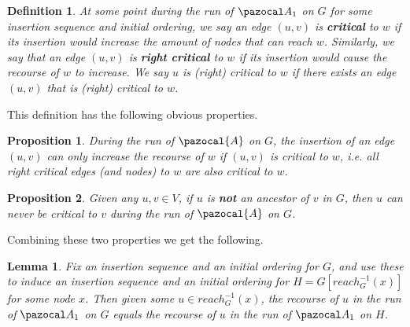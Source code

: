 \documentclass{report}
\newtheorem{lemma}{Lemma}
\newtheorem{proposition}{Proposition}
\newtheorem{definition}{Definition}
\begin{document}
\begin{definition}
At some point during the run of $\pazocal A_1$ on $G$ for some insertion sequence and initial ordering, we say an edge $(u,v)$ is \textbf{critical} to $w$ if its insertion would increase the amount of nodes that can reach $w$. Similarly, we say that an edge $(u,v)$ is \textbf{right critical} to $w$ if its insertion would cause the recourse of $w$ to increase. We say $u$ is (right) critical to $w$ if there exists an edge $(u,v)$ that is (right) critical to $w$.
\end{definition}

This definition has the following obvious properties.

\begin{proposition}
During the run of $\pazocal{A}$ on $G$, the insertion of an edge $(u,v)$ can only increase the recourse of $w$ if $(u,v)$ is critical to $w$, i.e. all right critical edges (and nodes) to $w$ are also critical to $w$.
\end{proposition}

\begin{proposition}
Given any $u,v \in V$, if $u$ is \textbf{not} an ancestor of $v$ in $G$, then $u$ can never be critical to $v$ during the run of $\pazocal{A}$ on $G$. 
\end{proposition}

Combining these two properties we get the following.

\begin{lemma}
Fix an insertion sequence and an initial ordering for $G$, and use these to induce an insertion sequence and an initial ordering for $H = G[reach^{-1}_{G}(x)]$ for some node $x$. Then given some $u \in reach^{-1}_{G}(x)$, the recourse of $u$ in the run of $\pazocal A_1$ on $G$ equals the recourse of $u$ in the run of $\pazocal A_1$ on $H$.
\end{lemma}
\end{document}
